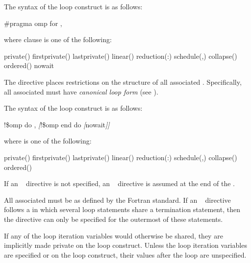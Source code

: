 \syntax
\ccppspecificstart
The syntax of the loop construct is as follows:

\begin{boxedcode}
\#pragma omp for \plc{[clause[ [},\plc{] clause] ... ] new-line} 
\end{boxedcode}

where clause is one of the following: 

\begin{indentedcodelist}
private()
firstprivate()
lastprivate()
linear()
reduction(:)
schedule(\plc{kind[},\plc{ chunk\_size]})
collapse()
ordered\plc{[}()\plc{]}
nowait
\end{indentedcodelist}

The  directive places restrictions on the structure of all associated . 
Specifically, all associated  must have \emph{canonical loop form} (see 
).
\ccppspecificend

\fortranspecificstart
The syntax of the loop construct is as follows:

\begin{boxedcode}
!\$omp do \plc{[clause[ [},\plc{] clause] ... ]}
\textsl{[}!\$omp end do \textsl{[}nowait\textsl{]]}
\end{boxedcode}

where  is one of the following:

\begin{indentedcodelist}
private()
firstprivate()
lastprivate()
linear()
reduction(:)
schedule(\plc{kind[},\plc{ chunk\_size]})
collapse()
ordered\plc{[}()\plc{]}
\end{indentedcodelist}

If an ~ directive is not specified, an ~ directive is assumed at the end of the 
.

All associated  must be  as defined by the Fortran standard. If an 
~ directive follows a  in which several loop statements share a  
termination statement, then the directive can only be specified for the outermost of these 
 statements. 

If any of the loop iteration variables would otherwise be shared, they are implicitly 
made private on the loop construct. Unless the loop iteration variables are specified 
 or  on the loop construct, their values after the loop are unspecified.
\fortranspecificend


